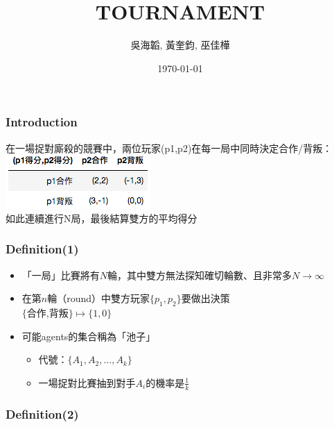 \documentclass[12pt,a4paper]{beamer}
\title{TOURNAMENT}
\author{吳海韜, 黃奎鈞, 巫佳樺}
\date{\today}
\begin{document}
\begin{CJK}{UTF8}{bsmi}
\maketitle

\begin{frame}
\frametitle{Introduction}

在一場捉對廝殺的競賽中，兩位玩家(p1,p2)在每一局中同時決定合作/背叛：
\centering\includegraphics{intro} \\
如此連續進行N局，最後結算雙方的平均得分

\end{frame}

\begin{frame}
\frametitle{Definition(1)}

\begin{itemize}

\item 「一局」比賽將有$N$輪，其中雙方無法探知確切輪數、且非常多$N\to\infty$
\item 在第$n$輪（round）中雙方玩家$\{p_1,p_2\}$要做出決策 \\ $\{$合作,背叛$\}$$\mapsto\{1,0\}$
\item 可能agents的集合稱為「池子」
	\begin{itemize}
	\item 代號：$\{A_1,A_2,...,A_k\}$
	\item 一場捉對比賽抽到對手$A_i$的機率是$\frac{1}{k}$
	\end{itemize}

\end{itemize}

\end{frame}

\begin{frame}
\frametitle{Definition(2)}

\begin{itemize}


\end{itemize}
\end{frame}
\end{CJK}
\end{document}
